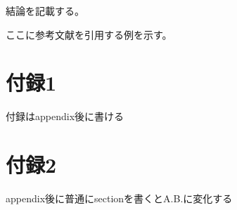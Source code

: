 \documentclass[titlepage]{jlreq}
\begin{document}
結論を記載する。

ここに参考文献を引用する例を示す。

\cite{hon2}

\cite{hon1-a}

\cite{hon1-b}

\cite{webpage1}

\cite{handbook}







\appendix

\section{付録1}

付録はappendix後に書ける

\section{付録2}

appendix後に普通にsectionを書くとA.B.に変化する
\end{document}

